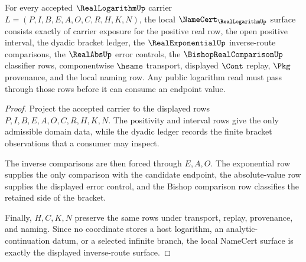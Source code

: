 \begin{theorem}
\label{thm:real-logarithm-namecert-obligations}
For every accepted $\RealLogarithmUp$ carrier $L=(P,I,B,E,A,O,C,R,H,K,N)$, the local $\NameCert_{\RealLogarithmUp}$ surface consists exactly of carrier exposure for the positive real row, the open positive interval, the dyadic bracket ledger, the $\RealExponentialUp$ inverse-route comparisons, the $\RealAbsUp$ error controls, the $\BishopRealComparisonUp$ classifier rows, componentwise $\hsame$ transport, displayed $\Cont$ replay, $\Pkg$ provenance, and the local naming row. Any public logarithm read must pass through those rows before it can consume an endpoint value.
\end{theorem}
\begin{proof}
Project the accepted carrier to the displayed rows $P,I,B,E,A,O,C,R,H,K,N$. The positivity and interval rows give the only admissible domain data, while the dyadic ledger records the finite bracket observations that a consumer may inspect.

The inverse comparisons are then forced through $E,A,O$. The exponential row supplies the only comparison with the candidate endpoint, the absolute-value row supplies the displayed error control, and the Bishop comparison row classifies the retained side of the bracket.

Finally, $H,C,K,N$ preserve the same rows under transport, replay, provenance, and naming. Since no coordinate stores a host logarithm, an analytic-continuation datum, or a selected infinite branch, the local NameCert surface is exactly the displayed inverse-route surface.
\end{proof}

